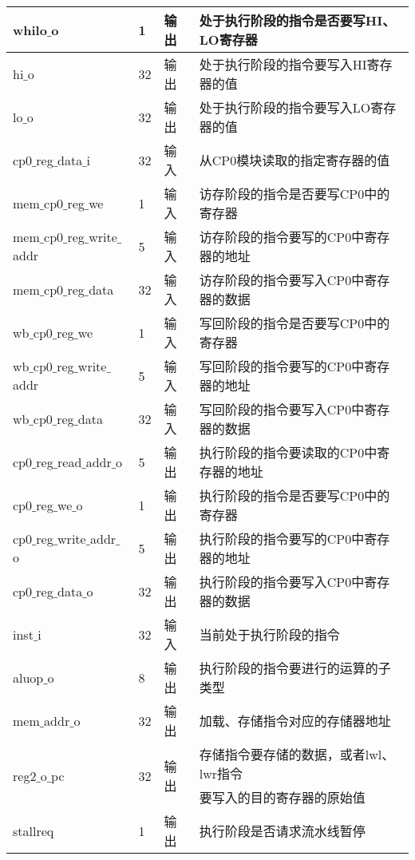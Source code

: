 \begin{table}[H]
	\centering
	\begin{tabular}{|l|l|l|l|}
		\hline
		whilo$\_$o & 1 & 输出 & 处于执行阶段的指令是否要写HI、LO寄存器 \\
		\hline
		hi$\_$o & 32 & 输出 & 处于执行阶段的指令要写入HI寄存器的值 \\
		\hline
		lo$\_$o & 32 & 输出 & 处于执行阶段的指令要写入LO寄存器的值 \\
		\hline
		cp0$\_$reg$\_$data$\_$i & 32 & 输入 & 从CP0模块读取的指定寄存器的值 \\
		\hline
		mem$\_$cp0$\_$reg$\_$we & 1 & 输入 & 访存阶段的指令是否要写CP0中的寄存器 \\
		\hline
		mem$\_$cp0$\_$reg$\_$write$\_$addr & 5 & 输入 & 访存阶段的指令要写的CP0中寄存器的地址 \\
		\hline
		mem$\_$cp0$\_$reg$\_$data & 32 & 输入 & 访存阶段的指令要写入CP0中寄存器的数据 \\
		\hline
		wb$\_$cp0$\_$reg$\_$we & 1 & 输入 & 写回阶段的指令是否要写CP0中的寄存器 \\
		\hline
		wb$\_$cp0$\_$reg$\_$write$\_$addr & 5 & 输入 & 写回阶段的指令要写的CP0中寄存器的地址 \\
		\hline
		wb$\_$cp0$\_$reg$\_$data & 32 & 输入 & 写回阶段的指令要写入CP0中寄存器的数据 \\
		\hline
		cp0$\_$reg$\_$read$\_$addr$\_$o & 5 & 输出 & 执行阶段的指令要读取的CP0中寄存器的地址 \\
		\hline
		cp0$\_$reg$\_$we$\_$o & 1 & 输出 & 执行阶段的指令是否要写CP0中的寄存器 \\
		\hline
		cp0$\_$reg$\_$write$\_$addr$\_$o & 5 & 输出 & 执行阶段的指令要写的CP0中寄存器的地址 \\
		\hline
		cp0$\_$reg$\_$data$\_$o & 32 & 输出 & 执行阶段的指令要写入CP0中寄存器的数据 \\
		\hline
		inst$\_$i & 32 & 输入 & 当前处于执行阶段的指令 \\
		\hline
		aluop$\_$o & 8 & 输出 & 执行阶段的指令要进行的运算的子类型 \\
		\hline
		mem$\_$addr$\_$o & 32 & 输出 & 加载、存储指令对应的存储器地址 \\
		\hline
		\multirow{2}{*}{reg2$\_$o$\_$pc} & \multirow{2}{*}{32} & \multirow{2}{*}{输出} & 存储指令要存储的数据，或者lwl、lwr指令 \\
		& & & 要写入的目的寄存器的原始值 \\
		\hline
		stallreq & 1 & 输出 & 执行阶段是否请求流水线暂停 \\
		\hline
	\end{tabular}
\end{table}
